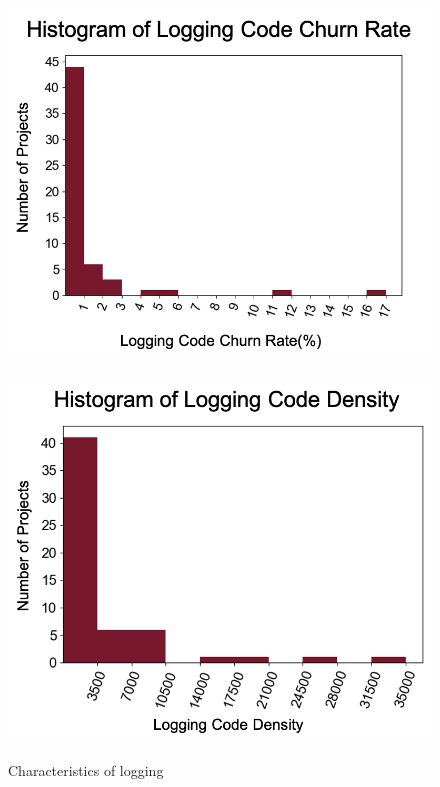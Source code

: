 \begin{figure}[htbp!]
\centering
\begin{minipage}{.5\textwidth}
  \centering
  \includegraphics[width=.8\linewidth]{images/mobile-analytics-logging/logging-churn-rate.png}
  \label{fig:logging-churn-rate}
\end{minipage}%
\begin{minipage}{.5\textwidth}
  \centering
  \includegraphics[width=.8\linewidth]{images/mobile-analytics-logging/logging-code-density.png}
  \label{fig:logging-code-density}
\end{minipage}
    \caption{Characteristics of logging}
    \label{fig:logging_rq_1}
\end{figure}

